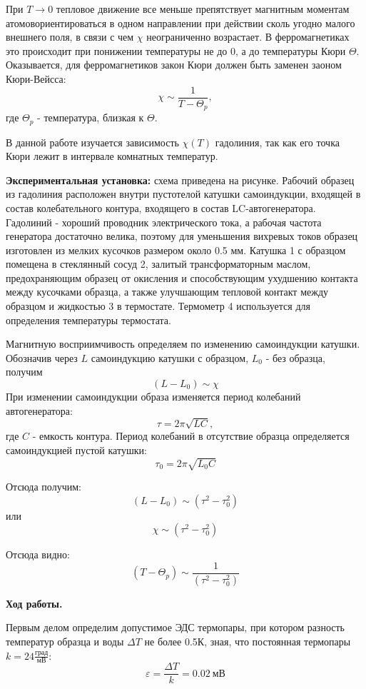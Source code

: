 \documentclass[14pt]{article}
\begin{document}
При $T \rightarrow 0$ тепловое движение все меньше препятствует магнитным моментам атомовориентироваться в одном направлении при действии сколь угодно малого внешнего поля, в связи с чем $\chi$ неограниченно возрастает. В ферромагнетиках это происходит при понижении температуры не до 0, а до температуры Кюри $\Theta$. Оказывается, для ферромагнетиков закон Кюри должен быть заменен заоном Кюри-Вейсса:
$$
	\chi \sim \frac{1}{T - \Theta_p},
$$
\noindent где $\Theta_p$ - температура, близкая к $\Theta$.

В данной работе изучается зависимость $\chi(T)$ гадолиния, так как его точка Кюри лежит в интервале комнатных температур.

\vspace{1cm}
\textbf{Экспериментальная установка:} схема приведена на рисунке. Рабочий образец из гадолиния расположен внутри пустотелой катушки самоиндукции, входящей в состав колебательного контура, входящего в состав LC-автогенератора. Гадолиний - хороший проводник электрического тока, а рабочая частота генератора достаточно велика, поэтому для уменьшения вихревых токов образец изготовлен из мелких кусочков размером около 0.5 мм. Катушка 1 с образцом помещена в стеклянный сосуд 2, залитый трансформаторным маслом, предохраняющим образец от окисления и способствующим ухудшению контакта между кусочками образца, а также улучшающим тепловой контакт между образцом и жидкостью 3 в термостате. Термометр 4 используется для определения температуры термостата. 

Магнитную восприимчивость определяем по изменению самоиндукции катушки. Обозначив через $L$ самоиндукцию катушки с образцом, $L_0$ - без образца, получим 
$$
	(L - L_0) \sim \chi
$$
При изменении самоиндукции образа изменяется период колебаний автогенератора:
$$
	\tau = 2\pi\sqrt{LC},
$$
\noindent где $C$ - емкость контура. Период колебаний в отсутствие образца определяется самоиндукцией пустой катушки:
$$
	\tau_0 = 2\pi\sqrt{L_0C}
$$

Отсюда получим:
$$
	(L - L_0) \sim (\tau^2 - \tau_0^2)
$$
\noindent или
$$
	\chi \sim (\tau^2 - \tau_0^2)
$$

Отсюда видно:
$$
	(T - \Theta_p) \sim \frac{1}{(\tau^2 - \tau_0^2)}
$$

\vspace{1cm}
\textbf{Ход работы.} 

Первым делом определим допустимое ЭДС термопары, при котором разность температур образца и воды $\Delta T$ не более 0.5К, зная, что постоянная термопары 
$k = 24\frac{\text{град}}{\text{мВ}}$:
$$
	\varepsilon = \frac{\Delta T}{k} = 0.02~\text{мВ}
$$
\end{document}
